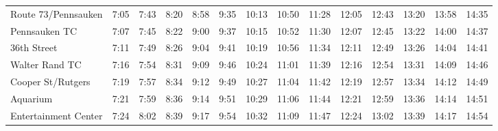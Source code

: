 \begin{center}
\begin{tabular}{@{}lrrrrrrrrrrrrr@{}}
Route 73/Pennsauken & 7:05 & 7:43 & 8:20 & 8:58 & 9:35 & 10:13 & 10:50 & 11:28 & 12:05 & 12:43 & 13:20 & 13:58 & 14:35 \\
Pennsauken TC & 7:07 & 7:45 & 8:22 & 9:00 & 9:37 & 10:15 & 10:52 & 11:30 & 12:07 & 12:45 & 13:22 & 14:00 & 14:37 \\
36th Street & 7:11 & 7:49 & 8:26 & 9:04 & 9:41 & 10:19 & 10:56 & 11:34 & 12:11 & 12:49 & 13:26 & 14:04 & 14:41 \\
Walter Rand TC & 7:16 & 7:54 & 8:31 & 9:09 & 9:46 & 10:24 & 11:01 & 11:39 & 12:16 & 12:54 & 13:31 & 14:09 & 14:46 \\
Cooper St/Rutgers & 7:19 & 7:57 & 8:34 & 9:12 & 9:49 & 10:27 & 11:04 & 11:42 & 12:19 & 12:57 & 13:34 & 14:12 & 14:49 \\
Aquarium & 7:21 & 7:59 & 8:36 & 9:14 & 9:51 & 10:29 & 11:06 & 11:44 & 12:21 & 12:59 & 13:36 & 14:14 & 14:51 \\
Entertainment Center & 7:24 & 8:02 & 8:39 & 9:17 & 9:54 & 10:32 & 11:09 & 11:47 & 12:24 & 13:02 & 13:39 & 14:17 & 14:54 \\
\bottomrule\end{tabular}\end{center}
